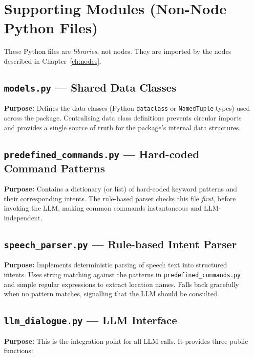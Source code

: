\documentclass[12pt,a4paper]{report}
\newcommand{\file}[1]{\texttt{\color{black!70}#1}}
\begin{document}
\chapter{Supporting Modules (Non-Node Python Files)}
\label{ch:modules}

These Python files are \emph{libraries}, not nodes.  They are imported by the
nodes described in Chapter~\ref{ch:nodes}.

\section{\texttt{models.py} — Shared Data Classes}

\textbf{Purpose:} Defines the data classes (Python \texttt{dataclass} or
\texttt{NamedTuple} types) used across the package.  Centralising data class
definitions prevents circular imports and provides a single source of truth for
the package's internal data structures.

\section{\texttt{predefined\_commands.py} — Hard-coded Command Patterns}

\textbf{Purpose:} Contains a dictionary (or list) of hard-coded keyword
patterns and their corresponding intents.  The rule-based parser checks this
file \emph{first}, before invoking the LLM, making common commands
instantaneous and LLM-independent.

\section{\texttt{speech\_parser.py} — Rule-based Intent Parser}

\textbf{Purpose:} Implements deterministic parsing of speech text into
structured intents.  Uses string matching against the patterns in
\file{predefined\_commands.py} and simple regular expressions to extract
location names.  Falls back gracefully when no pattern matches, signalling
that the LLM should be consulted.

\section{\texttt{llm\_dialogue.py} — LLM Interface}

\textbf{Purpose:} This is the integration point for all LLM calls.  It
provides three public functions:
\end{document}
